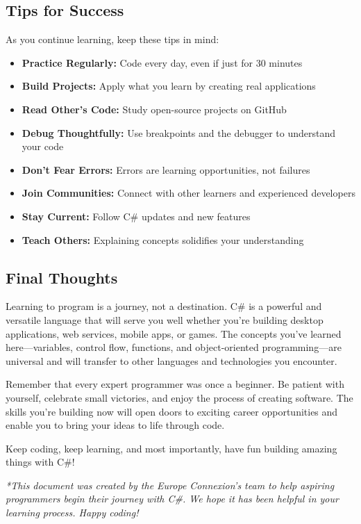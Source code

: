 \documentclass{article}
\begin{document}
\subsection{Tips for Success}
As you continue learning, keep these tips in mind:

\begin{itemize}
    \item \textbf{Practice Regularly:} Code every day, even if just for 30 minutes
    \item \textbf{Build Projects:} Apply what you learn by creating real applications
    \item \textbf{Read Other's Code:} Study open-source projects on GitHub
    \item \textbf{Debug Thoughtfully:} Use breakpoints and the debugger to understand your code
    \item \textbf{Don't Fear Errors:} Errors are learning opportunities, not failures
    \item \textbf{Join Communities:} Connect with other learners and experienced developers
    \item \textbf{Stay Current:} Follow C\# updates and new features
    \item \textbf{Teach Others:} Explaining concepts solidifies your understanding
\end{itemize}

\subsection{Final Thoughts}
Learning to program is a journey, not a destination. C\# is a powerful and versatile language that will serve you well whether you're building desktop applications, web services, mobile apps, or games. The concepts you've learned here—variables, control flow, functions, and object-oriented programming—are universal and will transfer to other languages and technologies you encounter.

Remember that every expert programmer was once a beginner. Be patient with yourself, celebrate small victories, and enjoy the process of creating software. The skills you're building now will open doors to exciting career opportunities and enable you to bring your ideas to life through code.

Keep coding, keep learning, and most importantly, have fun building amazing things with C\#!

\vspace{1cm}

\noindent\textit{*This document was created by the Europe Connexion's team to help aspiring programmers begin their journey with C\#. We hope it has been helpful in your learning process. Happy coding!}
\end{document}
